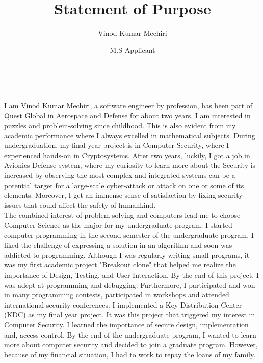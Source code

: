 \documentclass{article}
\title{Statement of Purpose}
\author{Vinod Kumar Mechiri}
\date{M.S Applicant}
\begin{document}
  \maketitle%
\

I am Vinod Kumar Mechiri, a software engineer by profession, has been part of Quest Global in Aerospace and Defense for about two years. I am interested in puzzles and problem-solving since childhood. This is also evident from my academic performance where I always excelled in mathematical subjects. During undergraduation, my final year project is in Computer Security, where I experienced hands-on in Cryptosystems. After two years, luckily, I got a job in Avionics Defense system, where my curiosity to learn more about the Security is increased by observing the most complex and integrated systems can be a potential target for a large-scale cyber-attack or attack on one or some of its elements. Moreover, I get an immense sense of satisfaction by fixing security issues that could affect the safety of humankind.
\\

The combined interest of problem-solving and computers lead me to choose Computer Science as the major for my undergraduate program. I started computer programming in the second semester of the undergraduate program. I liked the challenge of expressing a solution in an algorithm and soon was addicted to programming. Although I was regularly writing small programs, it was my first academic project "Breakout clone" that helped me realize the importance of Design, Testing, and User Interaction. By the end of this project, I was adept at programming and debugging.
Furthermore, I participated and won in many programming contests, participated in workshops and attended international security conferences. I implemented a Key Distribution Center (KDC) as my final year project. It was this project that triggered my interest in Computer Security. I learned the importance of secure design, implementation and, access control. By the end of the undergraduate program, I wanted to learn more about computer security and decided to join a graduate program. However, because of my financial situation, I had to work to repay the loans of my family.\\
\end{document}
